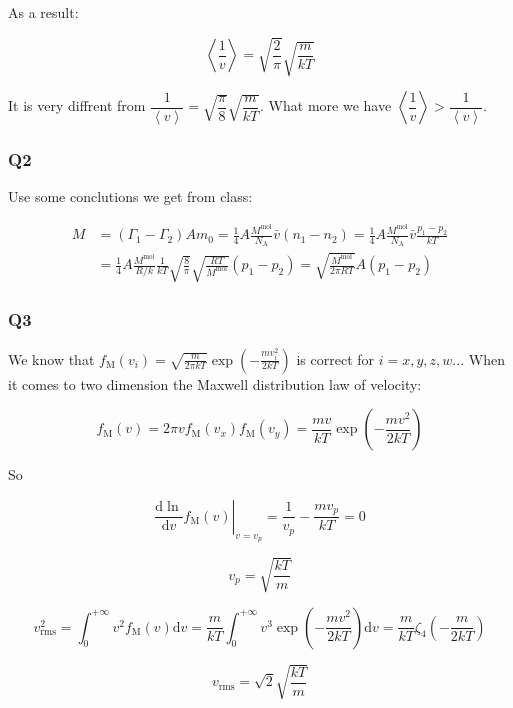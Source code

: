 \documentclass[a4paper,11pt]{amsart}
\theoremstyle{definition}
\begin{document}
	As a result:
	
	$$
	\left<\frac{1}{v}\right>=\sqrt{\frac{2}{\pi}}\sqrt{\frac{m}{kT}}
	$$
	
	It is very diffrent from $\displaystyle\dfrac{1}{\left<v\right>}=\sqrt{\dfrac{\pi}{8}}\sqrt{\dfrac{m}{kT}}.$ What more we have $\displaystyle\left<\dfrac{1}{v}\right>>\dfrac{1}{\left< v\right>}$.
	
    \subsubsection*{Q2}

	Use some conclutions we get from class:
	
	\begin{align}
		M&=\left( \varGamma _1-\varGamma _2 \right) Am_0=\frac{1}{4}A\frac{M^{\mathrm{mol}}}{N_{\mathrm{A}}}\bar{v}\left( n_1-n_2 \right) =\frac{1}{4}A\frac{M^{\mathrm{mol}}}{N_{\mathrm{A}}}\bar{v}\frac{p_1-p_2}{kT}\\
		&=\frac{1}{4}A\frac{M^{\mathrm{mol}}}{R/k}\frac{1}{kT}\sqrt{\frac{8}{\pi}}\sqrt{\frac{RT}{M^{\mathrm{mol}}}}\left( p_1-p_2 \right) =\sqrt{\frac{M^{\mathrm{mol}}}{2\pi RT}}A\left( p_1-p_2 \right) 
	\end{align}
	
    \subsubsection*{Q3}

	We know that $\displaystyle f_{\mathrm{M}}\left( v_i \right) =\sqrt{\frac{m}{2\pi kT}}\exp \left( -\frac{mv_{i}^{2}}{2kT} \right) $ is correct for $i=x, y, z, w...$ When it comes to two dimension the Maxwell distribution law of velocity:
	
	$$
	f_{\mathrm{M}}\left( v \right) =2\pi vf_{\mathrm{M}}\left( v_x \right) f_{\mathrm{M}}\left( v_y \right) =\frac{mv}{kT}\exp \left( -\frac{mv^2}{2kT} \right) 
	$$
	
	So
	
	$$
	\left. \frac{\mathrm{d}\ln}{\mathrm{d}v}f_{\mathrm{M}}\left( v \right) \right|_{v=v_p}=\frac{1}{v_p}-\frac{mv_p}{kT}=0
	$$
	
	$$
	v_p=\sqrt{\dfrac{kT}{m}}
	$$
	
	$$
	v_{\mathrm{rms}}^{2}=\int_0^{+\infty}{v^2f_{\mathrm{M}}\left( v \right) \mathrm{d}v=\frac{m}{kT}\int_0^{+\infty}{v^3\exp \left( -\frac{mv^2}{2kT} \right) \mathrm{d}v=}}\frac{m}{kT}\zeta _4\left( -\frac{m}{2kT} \right) 	
	$$

	$$
	v_{\mathrm{rms}}=\sqrt{2}\sqrt{\frac{kT}{m}}
	$$
	
\end{document}
